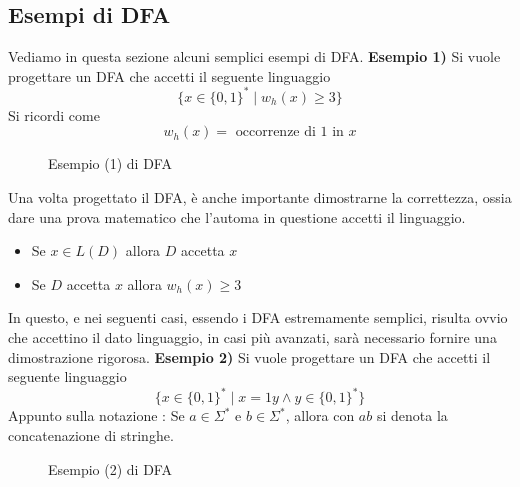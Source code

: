 \documentclass[10pt, letterpaper]{report}
\begin{document}
\subsection{Esempi di DFA}
Vediamo in questa sezione alcuni semplici esempi di DFA.\acc 
\textbf{Esempio 1)} Si vuole progettare un DFA che accetti il seguente linguaggio 
$$ \{x\in\{0,1\}^* \;|\;w_h(x)\ge 3 \}$$
Si ricordi come 
$$ w_h(x) = \text{ occorrenze di 1 in }x$$
\begin{figure}[h!]
    \centering
        \caption{Esempio (1) di DFA}
        \label{fig:DFAExample1}
\end{figure}
Una volta progettato il DFA, è anche importante dimostrarne la correttezza, ossia dare una prova 
matematico che l'automa in questione accetti il linguaggio.\begin{itemize}
    \item Se $x\in L(D)$ allora $D$ accetta $x$
    \item Se $D$ accetta $x$ allora $w_h(x)\ge 3$
\end{itemize}
In questo, e nei seguenti casi, essendo i DFA estremamente semplici, risulta ovvio che 
accettino il dato linguaggio, in casi più avanzati, sarà necessario fornire una dimostrazione 
rigorosa.\acc 
\textbf{Esempio 2)} Si vuole progettare un DFA che accetti il seguente linguaggio 
$$ \{x\in\{0,1\}^* \;|\;x=1y \land y \in  \{0,1\}^*\}$$
Appunto sulla notazione : Se $a\in \Sigma^*$ e $b\in \Sigma^*$, allora con $ab$ si 
denota la concatenazione di stringhe.\acc
\begin{figure}[h!]
    \centering
        \caption{Esempio (2) di DFA}
        \label{fig:DFAExample2}
\end{figure}\acc 
\end{document}
